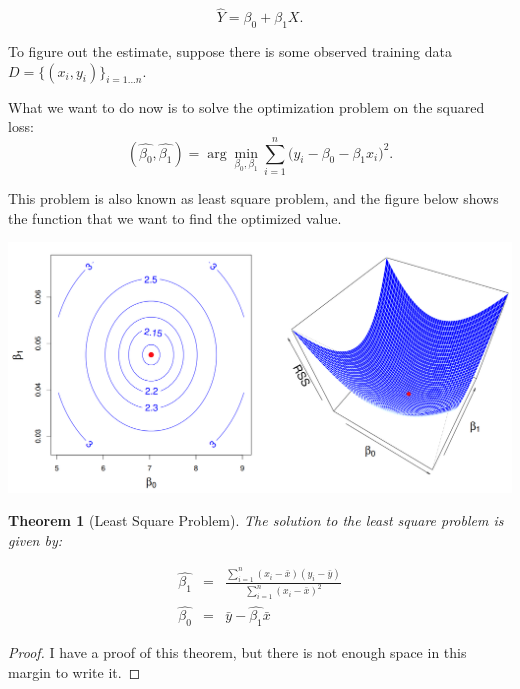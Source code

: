 \documentclass{article}
\theoremstyle{MyNonumberplain}
\theoremstyle{break}
\newtheorem*{proof}{Proof. }
\newcommand{\bt}[1]{\beta_{#1}}
\newcommand\ddfrac[2]{\frac{\displaystyle #1}{\displaystyle #2}}
\theoremstyle{break}
\newtheorem{theorem}{Theorem}[section]
\begin{document}
$$\hat{Y}=\bt{0}+\bt{1}X.$$

To figure out the estimate, suppose there is some observed training data $D=\biggl\{(x_i,y_i)\biggr\}_{i=1...n}$.

What we want to do now is to solve the optimization problem on the squared loss:
$$(\hat{\bt{0}},\hat{\bt{1}})=\arg\min_{\bt{0},\bt{1}}\sum_{i=1}^n\bigl(y_i-\bt{0}-\bt{1}x_i\bigr)^2.$$

This problem is also known as least square problem, and the figure below shows the function that we want to find the optimized value.

\begin{center}
    \includegraphics*[scale=0.25]{Images/img7.png}
\end{center}

\begin{thmbox}
    \begin{theorem}[Least Square Problem]
        The solution to the least square problem is given by: 
    \end{theorem}
        \begin{eqnarray*}
            \hat{\bt{1}}&=& \ddfrac{\sum_{i=1}^n(x_i-\bar{x})(y_i-\bar{y})}{\sum_{i=1}^n(x_i-\bar{x})^2}\\
            \hat{\bt{0}}&=& \bar{y}- \hat{\bt{1}}\bar{x}
        \end{eqnarray*}
        \begin{prfbox}
            \begin{proof}
                I have a proof of this theorem, but there is not enough space in this margin to write it. 
            \end{proof}
        \end{prfbox}
\end{thmbox}
\end{document}
